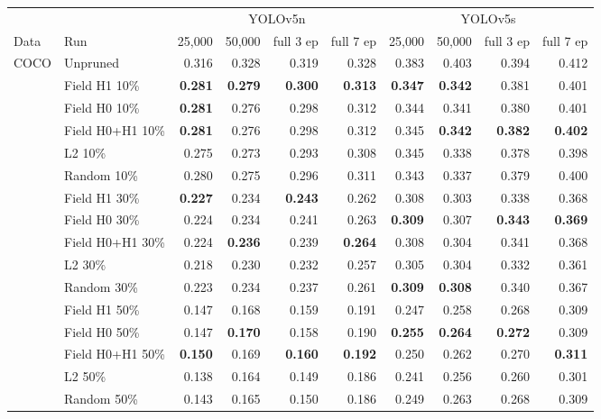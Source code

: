 \begin{tabular}{llrrrrrrrr}
\toprule
 & & \multicolumn{4}{c}{YOLOv5n} & \multicolumn{4}{c}{YOLOv5s} \\
\cmidrule(lr){3-6}\cmidrule(lr){7-10}
Data & Run & 25,000 & 50,000 & full 3 ep & full 7 ep & 25,000 & 50,000 & full 3 ep & full 7 ep \\
\midrule
COCO & Unpruned & 0.316 & 0.328 & 0.319 & 0.328 & 0.383 & 0.403 & 0.394 & 0.412 \\
 & Field H1 10\% & \textbf{0.281} & \textbf{0.279} & \textbf{0.300} & \textbf{0.313} & \textbf{0.347} & \textbf{0.342} & 0.381 & 0.401 \\
 & Field H0 10\% & \textbf{0.281} & 0.276 & 0.298 & 0.312 & 0.344 & 0.341 & 0.380 & 0.401 \\
 & Field H0+H1 10\% & \textbf{0.281} & 0.276 & 0.298 & 0.312 & 0.345 & \textbf{0.342} & \textbf{0.382} & \textbf{0.402} \\
 & L2 10\% & 0.275 & 0.273 & 0.293 & 0.308 & 0.345 & 0.338 & 0.378 & 0.398 \\
 & Random 10\% & 0.280 & 0.275 & 0.296 & 0.311 & 0.343 & 0.337 & 0.379 & 0.400 \\
\addlinespace[2pt]
 & Field H1 30\% & \textbf{0.227} & 0.234 & \textbf{0.243} & 0.262 & 0.308 & 0.303 & 0.338 & 0.368 \\
 & Field H0 30\% & 0.224 & 0.234 & 0.241 & 0.263 & \textbf{0.309} & 0.307 & \textbf{0.343} & \textbf{0.369} \\
 & Field H0+H1 30\% & 0.224 & \textbf{0.236} & 0.239 & \textbf{0.264} & 0.308 & 0.304 & 0.341 & 0.368 \\
 & L2 30\% & 0.218 & 0.230 & 0.232 & 0.257 & 0.305 & 0.304 & 0.332 & 0.361 \\
 & Random 30\% & 0.223 & 0.234 & 0.237 & 0.261 & \textbf{0.309} & \textbf{0.308} & 0.340 & 0.367 \\
\addlinespace[2pt]
 & Field H1 50\% & 0.147 & 0.168 & 0.159 & 0.191 & 0.247 & 0.258 & 0.268 & 0.309 \\
 & Field H0 50\% & 0.147 & \textbf{0.170} & 0.158 & 0.190 & \textbf{0.255} & \textbf{0.264} & \textbf{0.272} & 0.309 \\
 & Field H0+H1 50\% & \textbf{0.150} & 0.169 & \textbf{0.160} & \textbf{0.192} & 0.250 & 0.262 & 0.270 & \textbf{0.311} \\
 & L2 50\% & 0.138 & 0.164 & 0.149 & 0.186 & 0.241 & 0.256 & 0.260 & 0.301 \\
 & Random 50\% & 0.143 & 0.165 & 0.150 & 0.186 & 0.249 & 0.263 & 0.268 & 0.309 \\
\bottomrule
\end{tabular}
